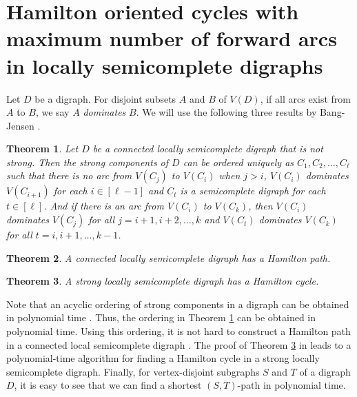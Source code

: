\documentclass{article}
\newtheorem{theorem}{Theorem}[section]
\newcommand{\AYn}[1]{{#1}}
\newcommand{\YLn}[1]{{#1}}
\newcommand{\2}{\vspace{0.2cm}}
\begin{document}
\section{Hamilton oriented cycles with maximum number of forward arcs in locally semicomplete digraphs}\label{sec:lsd}


Let $D$ be a digraph. For disjoint subsets $A$ and $B$ of $V(D)$, if all arcs exist from $A$ to $B$, we say $A$ {\em dominates} $B$.  We will use the following three results by
Bang-Jensen \cite{B90}.

\begin{theorem}\cite{B90}\label{thm: non-strong decomposition of LSD}
    Let $D$ be a connected locally semicomplete digraph that is not strong. Then the strong components of $D$ can be ordered uniquely as $C_1, C_2, \dots, C_{\ell}$ such that there is no arc from $V(C_j)$ to $V(C_i)$ when $j>i$, $V(C_i)$ dominates $V(C_{i+1})$ for each $i\in [\ell -1]$ and $C_t$ is a semicomplete digraph for each $t \in [\ell ]$. And if there is an arc from $V(C_i)$ to $V(C_k)$, then $V(C_i)$ dominates $V(C_j)$ for all $j=i+1,i+2, \dots,k$ and $V(C_t)$ dominates $V(C_k)$ for all $t=i,i+1,\dots,k-1$. \end{theorem}

\begin{theorem}\cite{B90}\label{thm: hp in LSD}
    A connected locally semicomplete digraph has a Hamilton path.
\end{theorem}

\begin{theorem}\cite{B90}\label{thm: hc in LSD}
    A strong locally semicomplete digraph has a Hamilton cycle.
\end{theorem}




Note that an acyclic ordering of strong components in a digraph can \YLn{be obtained} in polynomial time \cite{BG00}. Thus, the ordering in Theorem \ref{thm: non-strong decomposition of LSD} can be obtained in polynomial time. Using this ordering, it is not hard to construct a Hamilton path in a connected local semicomplete digraph \cite{B90}. The proof of Theorem \ref{thm: hc in LSD} in \cite{B90} leads to a polynomial-time algorithm for finding a Hamilton cycle \AYn{in} a strong locally semicomplete digraph. Finally, for vertex-disjoint subgraphs $S$ and $T$ of a digraph $D$, it is easy to see that we can find  a shortest $(S,T)$-path in polynomial time.



\vspace{1mm}
\end{document}

